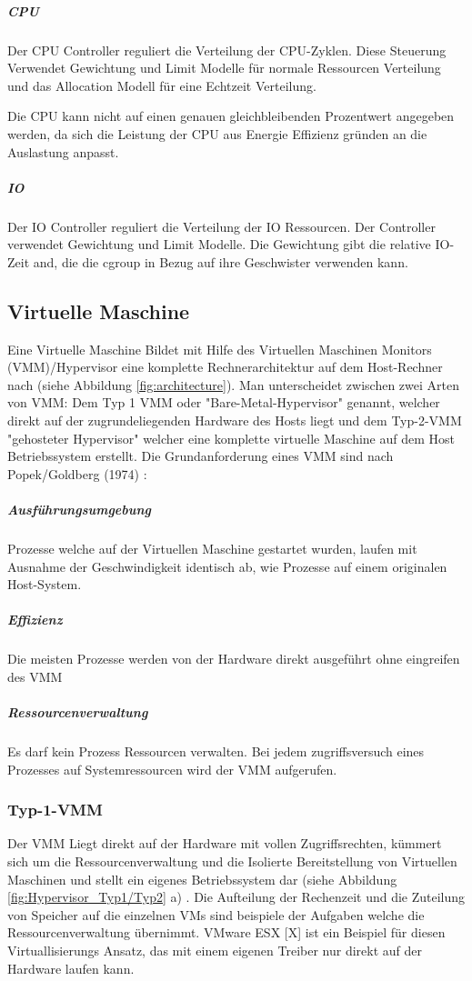 \subparagraph{CPU}
Der CPU Controller reguliert die Verteilung der CPU-Zyklen. Diese Steuerung Verwendet Gewichtung und Limit Modelle für normale Ressourcen Verteilung und das Allocation Modell für eine Echtzeit Verteilung.

Die CPU kann nicht auf einen genauen gleichbleibenden Prozentwert angegeben werden, da sich die Leistung der CPU aus Energie Effizienz gründen an die Auslastung anpasst.

\subparagraph{IO}
Der IO Controller reguliert die Verteilung der IO Ressourcen. Der Controller verwendet Gewichtung und Limit Modelle. Die Gewichtung gibt die relative IO-Zeit and, die die cgroup in Bezug auf ihre Geschwister verwenden kann.


\subsection{Virtuelle Maschine}
Eine Virtuelle Maschine Bildet mit Hilfe des Virtuellen Maschinen Monitors (VMM)/Hypervisor eine komplette Rechnerarchitektur auf dem Host-Rechner nach (siehe Abbildung \ref{fig:architecture}). Man unterscheidet zwischen zwei Arten von VMM: Dem Typ 1 VMM oder "Bare-Metal-Hypervisor" genannt, welcher direkt auf der zugrundeliegenden Hardware des Hosts liegt und dem Typ-2-VMM "gehosteter Hypervisor" welcher eine komplette virtuelle Maschine auf dem Host Betriebssystem erstellt. Die Grundanforderung eines VMM sind nach Popek/Goldberg (1974) \cite{Popek1974FormalArchitectures,Glatz2015Betriebssysteme} :

\subparagraph{Ausführungsumgebung}
Prozesse welche auf der Virtuellen Maschine gestartet wurden, laufen mit Ausnahme der Geschwindigkeit identisch ab, wie Prozesse auf einem originalen Host-System.

\subparagraph{Effizienz}
Die meisten Prozesse werden von der Hardware direkt ausgeführt ohne eingreifen des VMM

\subparagraph{Ressourcenverwaltung}

Es darf kein Prozess Ressourcen verwalten. Bei jedem zugriffsversuch eines Prozesses auf Systemressourcen wird der VMM aufgerufen.

\subsubsection{Typ-1-VMM}
Der VMM Liegt direkt auf der Hardware mit vollen Zugriffsrechten, kümmert sich um die Ressourcenverwaltung und die Isolierte Bereitstellung von Virtuellen Maschinen und stellt ein eigenes Betriebssystem dar (siehe Abbildung \ref{fig:Hypervisor_Typ1/Typ2} a) . Die Aufteilung der Rechenzeit und die Zuteilung von Speicher auf die einzelnen VMs sind beispiele der Aufgaben welche die Ressourcenverwaltung übernimmt. VMware ESX [X] ist ein Beispiel für diesen Virtuallisierungs Ansatz, das mit einem eigenen Treiber nur direkt auf der Hardware laufen kann.

